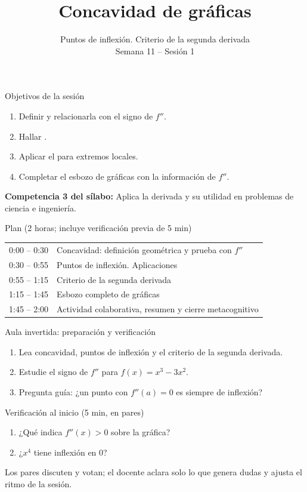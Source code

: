 \documentclass[10pt,aspectratio=169]{beamer}
\title[Concavidad e inflexión]{Concavidad de gráficas}
\subtitle{Puntos de inflexión. Criterio de la segunda derivada\\[2pt]\small Semana 11 -- Sesión 1}
\begin{document}
\begin{frame}
  \titlepage
\end{frame}

\begin{frame}{Objetivos de la sesión}
  \begin{enumerate}
    \item Definir  y relacionarla con el signo de $f''$.
    \item Hallar .
    \item Aplicar el  para extremos locales.
    \item Completar el esbozo de gráficas con la información de $f''$.
  \end{enumerate}
  \vspace{1mm}
  {\small\textbf{Competencia 3 del sílabo:} Aplica la derivada y su utilidad en problemas de ciencia e ingeniería.}
  \begin{block}{Plan (2 horas; incluye verificación previa de 5 min)}
    \begin{tabular}{ll}
      0:00 -- 0:30 & Concavidad: definición geométrica y prueba con $f''$\\
      0:30 -- 0:55 & Puntos de inflexión. Aplicaciones\\
      0:55 -- 1:15 & Criterio de la segunda derivada\\
      1:15 -- 1:45 & Esbozo completo de gráficas\\
      1:45 -- 2:00 & Actividad colaborativa, resumen y cierre metacognitivo
    \end{tabular}
  \end{block}
\end{frame}

\begin{frame}{Aula invertida: preparación y verificación}
  \small
  \begin{previa}
    \begin{enumerate}
      \item Lea concavidad, puntos de inflexión y el criterio de la segunda derivada.
      \item Estudie el signo de $f''$ para $f(x)=x^3-3x^2$.
      \item Pregunta guía: ¿un punto con $f''(a)=0$ es siempre de inflexión?
    \end{enumerate}
  \end{previa}
  \begin{block}{Verificación al inicio (5 min, en pares)}
    \begin{enumerate}
      \item ¿Qué indica $f''(x)>0$ sobre la gráfica?
      \item ¿$x^4$ tiene inflexión en $0$?
    \end{enumerate}
    Los pares discuten y votan; el docente aclara solo lo que genera dudas y ajusta el ritmo de la sesión.
  \end{block}
\end{frame}
\end{document}
